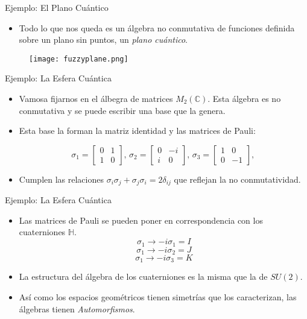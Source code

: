 \documentclass{beamer}
\begin{document}
\begin{frame}{Ejemplo: El Plano Cuántico}
\begin{itemize}
\item Todo lo que nos queda es un álgebra no conmutativa de funciones definida sobre un plano sin puntos, un \textit{plano cuántico}.

\end{itemize}

\begin{figure}
\texttt{[image: fuzzyplane.png]}
\end{figure}
\end{frame}


\begin{frame}{Ejemplo: La Esfera Cuántica}

\begin{itemize}
\item Vamosa fijarnos en el álbegra de matrices $M_2 (\mathbb{C})$. Esta álgebra es no conmutativa y se puede escribir una base que la genera.
\vspace{5mm}
\item Esta base la forman la matriz identidad y las matrices de Pauli:

\[
\sigma_1 =
  \begin{bmatrix}
    0 & 1  \\
    1 & 0
  \end{bmatrix}, \,
\sigma_2 =
  \begin{bmatrix}
    0 & -i  \\
    i & 0
  \end{bmatrix}, \,
  \sigma_3 =
  \begin{bmatrix}
    1 & 0  \\
    0 & -1
  \end{bmatrix}, \,  
\]
\vspace{5mm}
\item Cumplen las relaciones $\sigma_i \sigma_j +  \sigma_j \sigma_i = 2 \delta_{ij}$ que reflejan la no conmutatividad.
\end{itemize}
\end{frame}


\begin{frame}{Ejemplo: La Esfera Cuántica}

\begin{itemize}
\item Las matrices de Pauli se pueden poner en correspondencia con los cuaterniones $\mathbb{H}$. 
\[ \sigma_1 \to -i \sigma_1 = I 
\]
\[ \sigma_1 \to -i \sigma_2 = J 
\]
\[ \sigma_1 \to -i \sigma_3 = K 
\]

\vspace{5mm}
\item La estructura del álgebra de los cuaterniones es la misma que la de $SU(2)$.

\item Así como los espacios geométricos tienen simetrías que los caracterizan, las álgebras tienen \textit{Automorfismos}. 

\end{itemize}
\end{frame}
\end{document}
